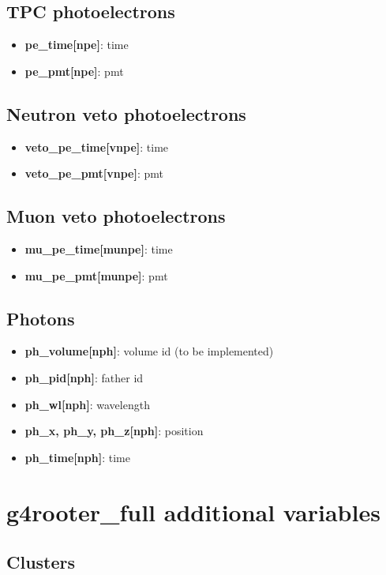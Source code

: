 \documentclass[twocolumn, 10pt]{article}
\begin{document}
\subsection{TPC photoelectrons}
\begin{itemize}
\item {\bf{pe\_time[npe]}}: time
\item {\bf{pe\_pmt[npe]}}:    pmt
\end{itemize}

\subsection{Neutron veto photoelectrons}
\begin{itemize}
\item {\bf{veto\_pe\_time[vnpe]}}:   time 
\item {\bf{veto\_pe\_pmt[vnpe]}}:  pmt
\end{itemize}

\subsection{Muon veto photoelectrons}
\begin{itemize}
\item {\bf{mu\_pe\_time[munpe]}}:   time
\item {\bf{mu\_pe\_pmt[munpe]}}:    pmt
\end{itemize}

\subsection{Photons}
\begin{itemize}
\item {\bf{ph\_volume[nph]}}: volume id (to be implemented)
\item {\bf{ph\_pid[nph]}}: father id
\item {\bf{ph\_wl[nph]}}: wavelength 
\item {\bf{ph\_x, ph\_y, ph\_z[nph]}}: position
\item {\bf{ph\_time[nph]}}: time

\end{itemize}


\section{g4rooter\_full additional variables}

\subsection{Clusters}
\end{document}
